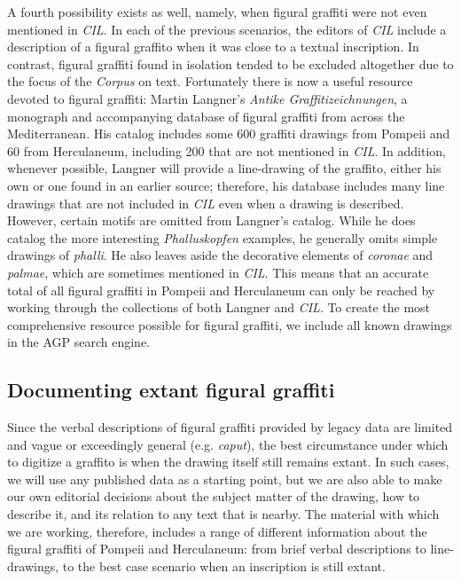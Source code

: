 \documentclass[amsthm,ebook]{saparticle}
\begin{document}
A fourth possibility exists as well, namely, when figural graffiti were not even mentioned in \emph{CIL}. In each of the
previous scenarios, the editors of \emph{CIL} include a description of a figural graffito when it was close to a textual
inscription. In contrast, figural graffiti found in isolation tended to be excluded altogether due to the focus of the
\emph{Corpus} on text. Fortunately there is now a useful resource devoted to figural graffiti: Martin Langner’s \emph{Antike
Graffitizeichnungen}, a monograph and accompanying database of figural graffiti from across the Mediterranean. His
catalog includes some 600 graffiti drawings from Pompeii and 60 from Herculaneum, including 200 that are not mentioned
in \emph{CIL}. In addition, whenever possible, Langner will provide a line-drawing of the graffito, either his own or one
found in an earlier source; therefore, his database includes many line drawings that are not included in \emph{CIL} even when
a drawing is described. However, certain motifs are omitted from Langner’s catalog. While he does catalog the more
interesting \emph{Phalluskopfen} examples, he generally omits simple drawings of \emph{phalli}. He also leaves aside the decorative
elements of \emph{coronae} and \emph{palmae}, which are sometimes mentioned in \emph{CIL}. This means that an accurate total of all figural
graffiti in Pompeii and Herculaneum can only be reached by working through the collections of both Langner and \emph{CIL}. To
create the most comprehensive resource possible for figural graffiti, we include all known drawings in the AGP search
engine. 




\subsection{Documenting extant figural graffiti}


\noindent Since the verbal descriptions of figural graffiti provided by legacy data are limited and vague or exceedingly general
(e.g. \emph{caput}), the best circumstance under which to digitize a graffito is when the drawing itself still remains extant.
 In such cases, we will use any published data as a starting point, but we are also able to make our own editorial
decisions about the subject matter of the drawing, how to describe it, and its relation to any text that is nearby.
The material with which we are working, therefore, includes a range of different information about the figural
graffiti of Pompeii and Herculaneum: from brief verbal descriptions to line-drawings, to the best case scenario when an
inscription is still extant. 
\end{document}
